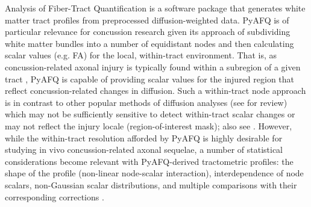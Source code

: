 \documentclass[]{imag-ms-template}
\begin{document}
Analysis of Fiber-Tract Quantification \parencite[PyAFQ;][]{yeatman2012TractProfilesWhite,kruper2021EvaluatingReliabilityHuman,kruper2024TractometryHumanConnectome} is a software package that generates white matter tract profiles from preprocessed diffusion-weighted data. PyAFQ is of particular relevance for concussion research given its approach of subdividing white matter bundles into a number of equidistant nodes and then calculating scalar values (e.g. FA) for the local, within-tract environment. That is, as concussion-related axonal injury is typically found within a subregion of a given tract \parencite[e.g. parasagittal splenium;][]{jang2020DiagnosticProblemsDiffuse,johnson2013AxonalPathologyTraumatic,lindsey2023DiffusionWeightedImagingMild}, PyAFQ is capable of providing scalar values for the injured region that reflect concussion-related changes in diffusion. Such a within-tract node approach is in contrast to other popular methods of diffusion analyses (see \textcite{lindsey2023DiffusionWeightedImagingMild} for review) which may not be sufficiently sensitive to detect within-tract scalar changes \parencite[e.g. whole-tract or skeletal analyses;][]{smith2006TractbasedSpatialStatistics,fischl2012FreeSurfer} or may not reflect the injury locale (region-of-interest mask); also see \textcite{goodrich-hunsaker2018AgeSexrelatedEffects}. However, while the within-tract resolution afforded by PyAFQ is highly desirable for studying in vivo concussion-related axonal sequelae, a number of statistical considerations become relevant with PyAFQ-derived tractometric profiles: the shape of the profile (non-linear node-scalar interaction), interdependence of node scalars, non-Gaussian scalar distributions, and multiple comparisons with their corresponding corrections \parencite{muncy2022GeneralAdditiveModels,richie-halford2021MultidimensionalAnalysisDetection}.
\end{document}
